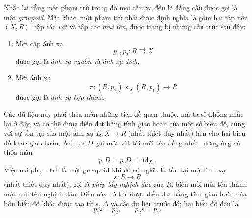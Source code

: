 \documentclass[11pt,twoside,openany]{book}
\numberwithin{equation}{section}
\newcommand{\src}[1]{%
  \phantomsection\hypertarget{src:\fgasourceid:#1}{}%
  \marginpar{\raggedleft\footnotesize\sffamily #1}%
}
\newcommand{\fgasourceid}{unset}
\begin{document}
Nhắc lại rằng một phạm trù trong đó mọi cấu xạ đều là đẳng cấu được gọi là một
\emph{groupoid}. Mặt khác, một phạm trù phải được định nghĩa là gồm hai tập nền
$(X,R)$, tập các \emph{vật} và tập các \emph{mũi tên}, được trang bị những cấu
trúc sau đây:
\src{106}
\begin{enumerate}
\item[(i)] Một cặp ánh xạ
\[
  p_1,p_2:R\rightrightarrows X
\]
được gọi là \emph{ánh xạ nguồn} và \emph{ánh xạ đích},

\item[(ii)] Một ánh xạ
\[
  \pi:(R,p_2)\times_X(R,p_1)\longrightarrow R
\]
được gọi là \emph{ánh xạ hợp thành}.
\end{enumerate}
Các dữ liệu này phải thỏa mãn những tiên đề quen thuộc, mà ta sẽ không nhắc
lại ở đây, và có thể được diễn đạt bằng tính giao hoán của một số biểu đồ,
cùng với sự tồn tại của một ánh xạ $D:X\to R$ (nhất thiết duy nhất) làm cho
hai biểu đồ khác giao hoán. Ánh xạ $D$ gửi một vật tới mũi tên đồng nhất tương ứng
và thỏa mãn
\[
  p_1D=p_2D=\operatorname{id}_X.
\]
Việc nói phạm trù là một groupoid khi đó có nghĩa là tồn tại một ánh xạ
\[
  s:R\longrightarrow R
\]
(nhất thiết duy nhất), gọi là \emph{phép lấy nghịch đảo} của $R$, biến mỗi
mũi tên thành một mũi tên nghịch đảo. Điều này có thể được diễn đạt bằng tính
giao hoán của bốn biểu đồ khác được tạo từ $s$, $\Delta$ và các dữ liệu trước
đó; hai biểu đồ đầu là
\[
  p_1s=p_2,\qquad p_2s=p_1.
\]
\end{document}
